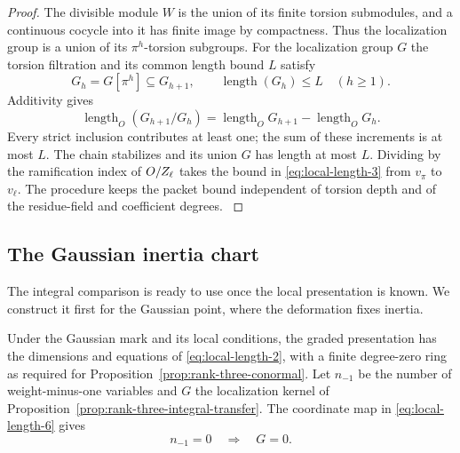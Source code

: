 \begin{proof}
The divisible module \(W\) is the union of its
finite torsion submodules, and a continuous cocycle
into it has finite image by compactness. Thus the
localization group is a union of its \(\pi^h\)-torsion
subgroups. For the localization group \(G\) the torsion filtration and its common length bound \(L\) satisfy
\[
 G_h=G[\pi^h]\subseteq G_{h+1},\qquad \operatorname{length}(G_h)\le L\quad(h\ge1).
\] Additivity gives
\[
 \operatorname{length}_O(G_{h+1}/G_h)
 =\operatorname{length}_O G_{h+1}-\operatorname{length}_O G_h .
\]
Every strict inclusion contributes at least one; the sum of these increments is at most \(L\). The chain stabilizes and its union \(G\) has length at most \(L\). Dividing by the
ramification index of \(O/Z_\ell\) takes the bound
in \eqref{eq:local-length-3} from \(v_\pi\) to \(v_\ell\). The procedure
keeps the packet bound independent of torsion depth
and of the residue-field and coefficient degrees.
\label{cor:ordinary-rank-three-length-3}

\end{proof}

\subsection{The Gaussian inertia chart}

The integral comparison is ready to use once the local presentation is known. We
construct it first for the Gaussian point, where the deformation fixes inertia.

\begin{proposition}
\label{prop:gaussian-rank-three-chart}
Under the Gaussian mark and its local conditions, the graded
presentation has the dimensions and equations of \textup{\eqref{eq:local-length-2}},
with a finite degree-zero ring as required for
Proposition~\ref{prop:rank-three-conormal}. Let \(n_{-1}\) be the number of weight-minus-one variables and \(G\) the
localization kernel of Proposition~\ref{prop:rank-three-integral-transfer}.
The coordinate map in \eqref{eq:local-length-6} gives
\[
                         n_{-1}=0\quad\Longrightarrow\quad G=0 .
\]
\end{proposition}

